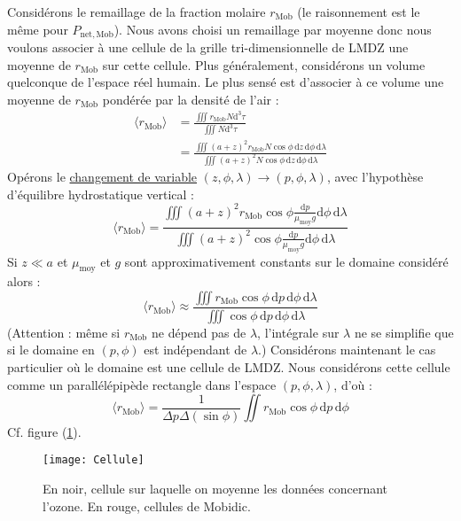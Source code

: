 \documentclass[a4paper,english,french]{article}
\newcommand{\ud}{\mathrm{d}}
\begin{document}
Considérons le remaillage de la fraction molaire $r_\mathrm{Mob}$ (le
raisonnement est le même pour $P_\mathrm{net,Mob}$). Nous avons choisi
un remaillage par moyenne donc nous voulons associer à une cellule de
la grille tri-dimensionnelle de LMDZ une moyenne de $r_\mathrm{Mob}$
sur cette cellule. Plus généralement, considérons un volume quelconque
de l'espace réel humain. Le plus sensé est d'associer à ce volume une
moyenne de $r_\mathrm{Mob}$ pondérée par la densité de l'air :
\begin{align*}
  \langle r_\mathrm{Mob} \rangle
  & = \frac{\iiint r_\mathrm{Mob} N \ud^3 \tau}{\iiint N \ud^3 \tau} \\
  & = \frac{\iiint (a + z)^2 r_\mathrm{Mob} N \cos\phi\,\ud z\, \ud \phi\, \ud \lambda}
  {\iiint (a + z)^2 N \cos\phi\, \ud z\, \ud \phi\, \ud \lambda}
\end{align*}
Opérons le
\hyperref{file:///user/guez/Documents/Commentaires_lectures/Autres_publications/1992-/Holton_2004/Chapter_3.texfol/chapter_3.dvi}{text}{z2p}{changement
  de variable} $(z, \phi, \lambda) \to (p, \phi, \lambda)$, avec
l'hypothèse d'équilibre hydrostatique vertical :
\begin{displaymath}
  \langle r_\mathrm{Mob} \rangle = \frac
  {
    \iiint (a + z)^2 r_\mathrm{Mob} \cos\phi \frac{\ud p}{\mu_\mathrm{moy} g}
    \ud \phi\, \ud \lambda
  }
  {
    \iiint (a + z)^2 \cos\phi \frac{\ud p}{\mu_\mathrm{moy} g}
    \ud \phi\, \ud \lambda
  }
\end{displaymath}
Si $z \ll a$ et $\mu_\mathrm{moy}$ et $g$ sont approximativement
constants sur le domaine considéré alors :
\begin{displaymath}
  \langle r_\mathrm{Mob} \rangle \approx \frac
  {\iiint r_\mathrm{Mob} \cos\phi\, \ud p\, \ud \phi\, \ud \lambda}
  {\iiint \cos\phi \, \ud p\, \ud \phi\, \ud \lambda}
\end{displaymath}
(Attention : même si $r_\mathrm{Mob}$ ne dépend pas de $\lambda$, l'intégrale sur
$\lambda$ ne se simplifie que si le domaine en $(p, \phi)$ est
indépendant de $\lambda$.) Considérons maintenant le cas particulier
où le domaine est une cellule de LMDZ. Nous considérons cette cellule
comme un parallélépipède rectangle dans l'espace $(p, \phi, \lambda)$,
d'où :
\begin{displaymath}
  \langle r_\mathrm{Mob} \rangle = \frac{1}{\Delta p \Delta(\sin\phi)}
  \iint r_\mathrm{Mob} \cos\phi\, \ud p\, \ud \phi
\end{displaymath}
Cf. figure (\ref{fig:Cellule}).
\begin{figure}[htbp]
  \centering
  \texttt{[image: Cellule]}
  \caption[Remaillage de la paramétrisation de la chimie de
  l'ozone]{En noir, cellule sur laquelle on moyenne les données
    concernant l'ozone. En rouge, cellules de Mobidic.}
  \label{fig:Cellule}
\end{figure}
\end{document}

